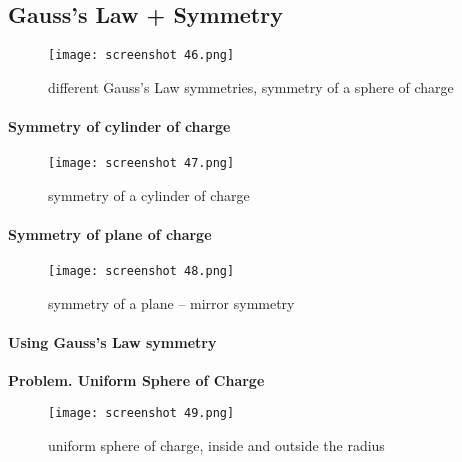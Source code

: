 \documentclass[svgnames]{article}   	%
\begin{document}
\subsection{Gauss's Law + Symmetry} 


\begin{figure}[H]
  \centering
    \texttt{[image: screenshot 46.png]}
    \caption{different Gauss's Law symmetries, symmetry of a sphere of charge}
\end{figure}


\paragraph{Symmetry of cylinder of charge}


\begin{figure}[H]
  \centering
    \texttt{[image: screenshot 47.png]}
    \caption{symmetry of a cylinder of charge}
\end{figure}


\paragraph{Symmetry of plane of charge}


\begin{figure}[H]
  \centering
    \texttt{[image: screenshot 48.png]}
    \caption{symmetry of a plane -- mirror symmetry}
\end{figure}



\paragraph{Using Gauss's Law symmetry}

\textbf{Problem. Uniform Sphere of Charge}  
  
\begin{figure}[H]
  \centering
    \texttt{[image: screenshot 49.png]}
    \caption{uniform sphere of charge, inside and outside the radius}
\end{figure}
\end{document}
